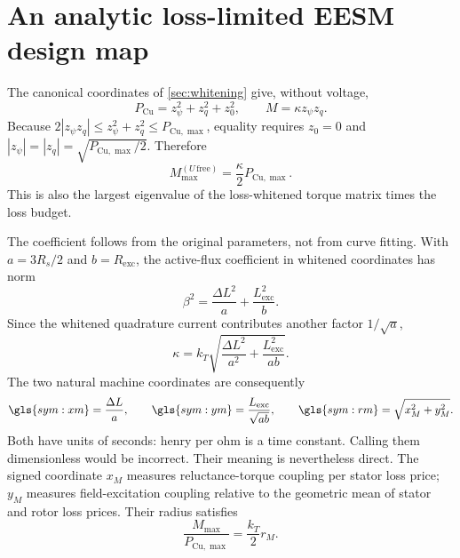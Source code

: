 \section{An analytic loss-limited EESM design map}
\label{sec:eesm-design-map}

The canonical coordinates of \cref{sec:whitening} give, without voltage,
\begin{equation}
 P_{\mathrm{Cu}}=z_\psi^2+z_q^2+z_0^2,
 \qquad M=\kappa z_\psi z_q.
\end{equation}
Because \(2|z_\psi z_q|\leq z_\psi^2+z_q^2\leq
P_{\mathrm{Cu},\max}\), equality requires
\(z_0=0\) and \(|z_\psi|=|z_q|=\sqrt{P_{\mathrm{Cu},\max}/2}\).
Therefore
\begin{equation}
 \boxed{M_{\max}^{(U\,\mathrm{free})}
 =\frac{\kappa}{2}P_{\mathrm{Cu},\max}.}
 \label{eq:eesm-mmax-loss}
\end{equation}
This is also the largest eigenvalue of the loss-whitened torque matrix times
the loss budget.

The coefficient follows from the original parameters, not from curve fitting.
With \(a=3R_s/2\) and \(b=R_{\mathrm{exc}}\), the active-flux coefficient in
whitened coordinates has norm
\begin{equation}
 \beta^2=\frac{\Delta L^2}{a}+\frac{L_{\mathrm{exc}}^2}{b}.
\end{equation}
Since the whitened quadrature current contributes another factor
\(1/\sqrt a\),
\begin{equation}
 \boxed{\kappa=k_T\sqrt{\frac{\Delta L^2}{a^2}
 +\frac{L_{\mathrm{exc}}^2}{ab}}.}
 \label{eq:kappa-machine-parameters}
\end{equation}
The two natural machine coordinates are consequently
\begin{equation}
 \gls{sym:xm}=\frac{\Delta L}{a},\qquad
 \gls{sym:ym}=\frac{L_{\mathrm{exc}}}{\sqrt{ab}},\qquad
 \gls{sym:rm}=\sqrt{x_M^2+y_M^2}.
 \label{eq:machine-coordinates}
\end{equation}
Both have units of seconds: henry per ohm is a time constant.  Calling them
dimensionless would be incorrect.  Their meaning is nevertheless direct.
The signed coordinate \(x_M\) measures reluctance-torque coupling per stator
loss price; \(y_M\) measures field-excitation coupling relative to the
geometric mean of stator and rotor loss prices.  Their radius satisfies
\begin{equation}
 \boxed{\frac{M_{\max}}{P_{\mathrm{Cu},\max}}
 =\frac{k_T}{2}r_M.}
 \label{eq:torque-per-loss-radius}
\end{equation}

